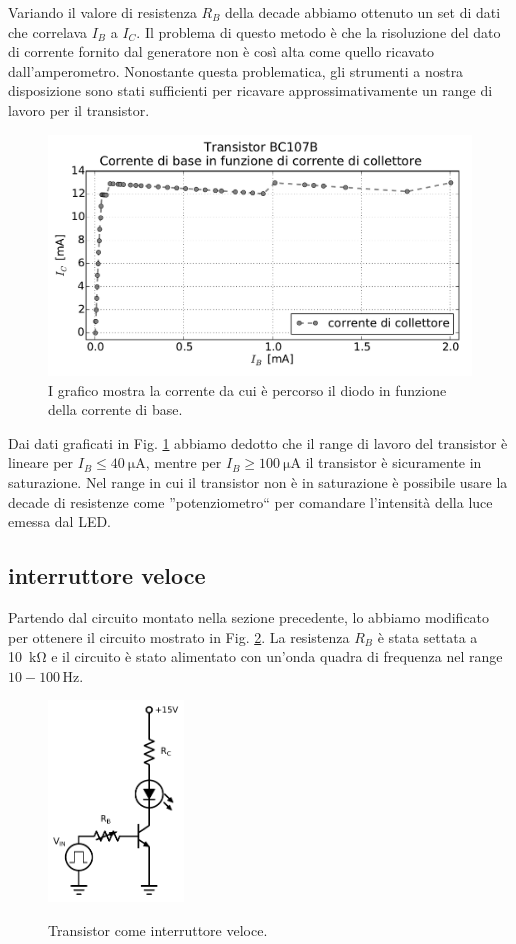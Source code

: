 Variando il valore di resistenza $R_B$ della decade abbiamo ottenuto un set di dati che correlava $I_B$ a $I_C$. Il problema di questo metodo è che la risoluzione del dato di corrente fornito dal generatore non è così alta come quello ricavato dall'amperometro. Nonostante questa problematica, gli strumenti a nostra disposizione sono stati sufficienti per ricavare approssimativamente un range di lavoro per il transistor.

\begin{figure}
	\includegraphics[width=120mm]{saturazione.pdf}
	\caption{I grafico mostra la corrente da cui è percorso il diodo in funzione della corrente di base.}
	\label{fig:saturazione}
\end{figure}

Dai dati graficati in Fig. \ref{fig:saturazione} abbiamo dedotto che il range di lavoro del transistor è lineare per $I_B \leq \SI{40}{\micro\ampere}$, mentre per $I_B \geq \SI{100}{\micro\ampere}$ il transistor è sicuramente in saturazione. Nel range in cui il transistor non è in saturazione è possibile usare la decade di resistenze come ''potenziometro`` per comandare l'intensità della luce emessa dal LED.

\subsection{interruttore veloce}
Partendo dal circuito montato nella sezione precedente, lo abbiamo modificato per ottenere il circuito mostrato in Fig. \ref{fig:cc2}. La resistenza $R_B$ è stata settata a \SI{10}{\kilo\ohm} e il circuito è stato alimentato con un'onda quadra di frequenza nel range $10-100\,\si{\hertz}$.

\begin{figure}
	\caption{Transistor come interruttore veloce.}
	\includegraphics[width=36mm]{cc2.pdf}
	\label{fig:cc2}
\end{figure}

